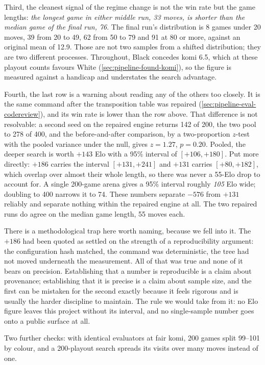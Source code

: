 Third, the cleanest signal of the regime change is not the win rate but the game
lengths: \emph{the longest game in either middle run, 33 moves, is shorter than
the median game of the final run, 76}. The final run's distribution is 8 games
under 20 moves, 39 from 20 to 49, 62 from 50 to 79 and 91 at 80 or more, against
an original mean of 12.9. Those are not two samples from a shifted distribution;
they are two different processes. Throughout, Black concedes komi 6.5, which at
these playout counts favours White (\cref{sec:pipeline-found-komi}), so the
figure is measured against a handicap and understates the search advantage.

Fourth, the last row is a warning about reading any of the others too closely.
It is the same command after the transposition table was repaired
(\cref{sec:pipeline-eval-codereview}), and its win rate is lower than the row
above. That difference is not resolvable: a second seed on the repaired engine
returns 142 of 200, the two pool to 278 of 400, and the before-and-after
comparison, by a two-proportion $z$-test with the
pooled variance under the null, gives $z = 1.27$, $p = 0.20$. Pooled, the deeper search is worth $+143$ Elo
with a 95\% interval of $[+106, +180]$. Put more directly: $+186$ carries the
interval $[+131, +241]$ and $+131$ carries $[+80, +182]$, which overlap over
almost their whole length, so there was never a 55-Elo drop to account for. A
single 200-game arena gives a 95\% interval roughly \emph{105} Elo wide;
doubling to 400 narrows it to 74. These numbers separate $-576$ from $+131$
reliably and separate nothing within the repaired engine at all. The two
repaired runs do agree on the median game length, 55 moves each.

There is a methodological trap here worth naming, because we fell into it. The
$+186$ had been quoted as settled on the strength of a reproducibility
argument: the configuration hash matched, the command was deterministic, the
tree had not moved underneath the measurement. All of that was true and none of
it bears on precision. Establishing that a number is reproducible is a claim
about provenance; establishing that it is precise is a claim about sample size,
and the first can be mistaken for the second exactly because it feels rigorous
and is usually the harder discipline to maintain. The rule we would take from
it: no Elo figure leaves this project without its interval, and no
single-sample number goes onto a public surface at all.

Two further checks: with identical evaluators at fair komi, 200 games split
99--101 by colour, and a 200-playout search spreads its visits over many moves
instead of one.

